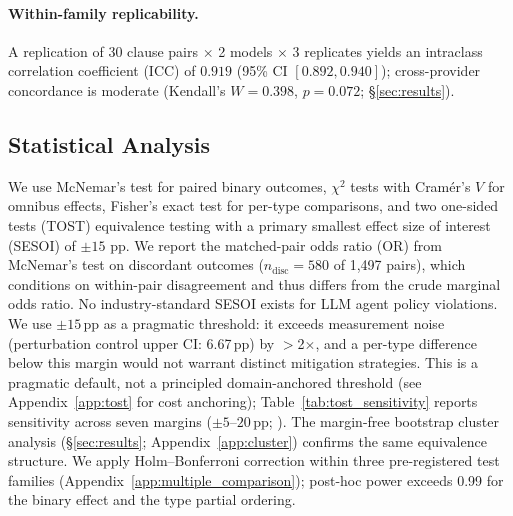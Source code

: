 \paragraph{Within-family replicability.} A replication of 30 clause pairs $\times$ 2 models $\times$ 3 replicates yields an intraclass correlation coefficient (ICC) of $0.919$ (95\% CI $[0.892, 0.940]$); cross-provider concordance is moderate (Kendall's $W = 0.398$, $p = 0.072$; \S\ref{sec:results}).

\subsection{Statistical Analysis}

We use McNemar's test for paired binary outcomes, $\chi^2$ tests with Cram\'{e}r's $V$ for omnibus effects, Fisher's exact test for per-type comparisons, and two one-sided tests (TOST) equivalence testing \citep{lakens_2017} with a primary smallest effect size of interest (SESOI) of $\pm 15$ pp. We report the matched-pair odds ratio (OR) from McNemar's test on discordant outcomes ($n_{\text{disc}} = 580$ of 1{,}497 pairs), which conditions on within-pair disagreement and thus differs from the crude marginal odds ratio. No industry-standard SESOI exists for LLM agent policy violations. We use $\pm 15$\,pp as a pragmatic threshold: it exceeds measurement noise (perturbation control upper CI: 6.67\,pp) by $>$2$\times$, and a per-type difference below this margin would not warrant distinct mitigation strategies. This is a pragmatic default, not a principled domain-anchored threshold (see Appendix~\ref{app:tost} for cost anchoring); Table~\ref{tab:tost_sensitivity} reports sensitivity across seven margins ($\pm 5$--$20$\,pp; \citealp{anvari_lakens_2021}). The margin-free bootstrap cluster analysis (\S\ref{sec:results}; Appendix~\ref{app:cluster}) confirms the same equivalence structure. We apply Holm--Bonferroni correction within three pre-registered test families (Appendix~\ref{app:multiple_comparison}); post-hoc power exceeds 0.99 for the binary effect and the type partial ordering.
